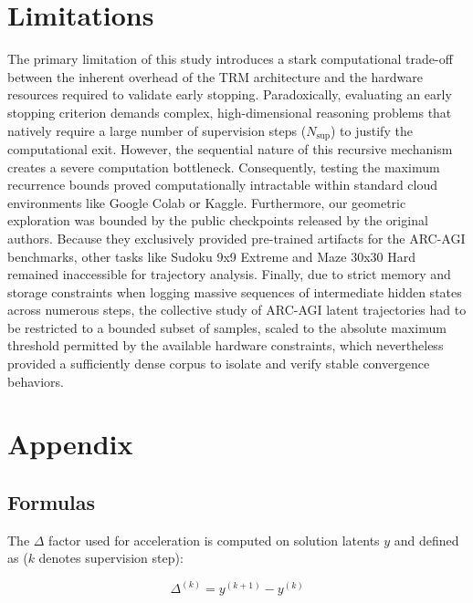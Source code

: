 \documentclass{article}
\begin{document}



\section*{Limitations}
The primary limitation of this study introduces a stark computational trade-off between the inherent overhead of the TRM architecture and the hardware resources required to validate early stopping.
Paradoxically, evaluating an early stopping criterion demands complex, high-dimensional reasoning problems that natively require a large number of supervision steps ($N_{\text{sup}}$) to justify the computational exit.
However, the sequential nature of this recursive mechanism creates a severe computation bottleneck. Consequently, testing the maximum recurrence bounds proved computationally intractable within standard cloud environments like Google Colab or Kaggle.
Furthermore, our geometric exploration was bounded by the public checkpoints released by the original authors. Because they exclusively provided pre-trained artifacts for the ARC-AGI benchmarks, other tasks like Sudoku 9x9 Extreme and Maze 30x30 Hard remained inaccessible for trajectory analysis.
Finally, due to strict memory and storage constraints when logging massive sequences of intermediate hidden states across numerous steps, the collective study of ARC-AGI latent trajectories had to be restricted to a bounded subset of samples, scaled to the absolute maximum threshold permitted by the available hardware constraints, which nevertheless provided a sufficiently dense corpus to isolate and verify stable convergence behaviors.


\clearpage
\onecolumn

\section*{Appendix}


\subsection*{Formulas}

The $\Delta$ factor used for acceleration is computed on solution latents $y$ and defined as ($k$ denotes supervision step):

\begin{equation}
    \label{eq:delta}
    \Delta^{(k)} = y^{(k+1)} - y^{(k)}
\end{equation}
\end{document}
